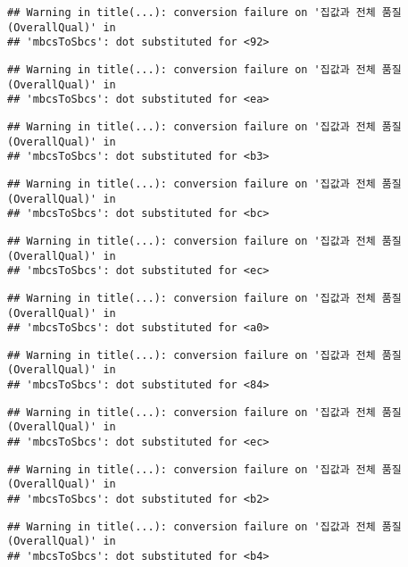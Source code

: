\documentclass[
]{article}
\begin{document}
\begin{verbatim}
## Warning in title(...): conversion failure on '집값과 전체 품질(OverallQual)' in
## 'mbcsToSbcs': dot substituted for <92>
\end{verbatim}

\begin{verbatim}
## Warning in title(...): conversion failure on '집값과 전체 품질(OverallQual)' in
## 'mbcsToSbcs': dot substituted for <ea>
\end{verbatim}

\begin{verbatim}
## Warning in title(...): conversion failure on '집값과 전체 품질(OverallQual)' in
## 'mbcsToSbcs': dot substituted for <b3>
\end{verbatim}

\begin{verbatim}
## Warning in title(...): conversion failure on '집값과 전체 품질(OverallQual)' in
## 'mbcsToSbcs': dot substituted for <bc>
\end{verbatim}

\begin{verbatim}
## Warning in title(...): conversion failure on '집값과 전체 품질(OverallQual)' in
## 'mbcsToSbcs': dot substituted for <ec>
\end{verbatim}

\begin{verbatim}
## Warning in title(...): conversion failure on '집값과 전체 품질(OverallQual)' in
## 'mbcsToSbcs': dot substituted for <a0>
\end{verbatim}

\begin{verbatim}
## Warning in title(...): conversion failure on '집값과 전체 품질(OverallQual)' in
## 'mbcsToSbcs': dot substituted for <84>
\end{verbatim}

\begin{verbatim}
## Warning in title(...): conversion failure on '집값과 전체 품질(OverallQual)' in
## 'mbcsToSbcs': dot substituted for <ec>
\end{verbatim}

\begin{verbatim}
## Warning in title(...): conversion failure on '집값과 전체 품질(OverallQual)' in
## 'mbcsToSbcs': dot substituted for <b2>
\end{verbatim}

\begin{verbatim}
## Warning in title(...): conversion failure on '집값과 전체 품질(OverallQual)' in
## 'mbcsToSbcs': dot substituted for <b4>
\end{verbatim}
\end{document}
